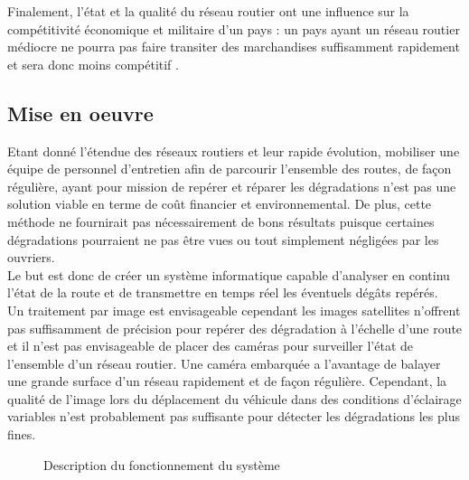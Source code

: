 Finalement, l'état et la qualité du réseau routier ont une influence sur la compétitivité économique et militaire d'un pays : un pays ayant un réseau routier médiocre ne pourra pas faire transiter des marchandises suffisamment rapidement et sera donc moins compétitif \cite{economique}. 


\subsection{Mise en oeuvre}
Etant donné l'étendue des réseaux routiers et leur rapide évolution, mobiliser
une équipe de personnel d'entretien afin de parcourir l'ensemble des routes, de
façon régulière, ayant pour mission de repérer et réparer les dégradations
n'est pas une
solution viable en terme de coût financier et environnemental. De plus, cette
méthode ne fournirait pas nécessairement de bons résultats puisque certaines
dégradations pourraient ne pas être vues ou tout simplement négligées par les
ouvriers.\\

Le but est donc de créer un système informatique capable d'analyser en continu
l'état de la
route et de transmettre en temps réel les éventuels dégâts repérés.\\

Un traitement par image est envisageable cependant les images satellites
n'offrent pas suffisamment de précision pour repérer des dégradation à
l'échelle d'une route et il n'est pas envisageable de placer des caméras pour
surveiller l'état de l'ensemble d'un réseau routier. Une caméra embarquée a
l'avantage de balayer une grande surface d'un réseau rapidement et de façon
régulière. Cependant, la qualité de l'image lors du déplacement du véhicule
dans des conditions d'éclairage variables n'est probablement pas suffisante
pour détecter les dégradations les plus fines.

\begin{figure}[H]
    \centering
    \caption{Description du fonctionnement du système}
    \label{analyse}
\end{figure}

